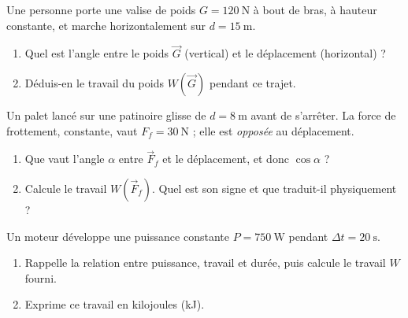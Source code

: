 \documentclass[11pt,a4paper]{article}
\newcommand{\vv}[1]{\vec{#1}}\newcommand{\ds}{\displaystyle}
\begin{document}
\begin{exo}
Une personne porte une valise de poids $G=\qty{120}{\newton}$ à bout de bras, à hauteur constante,
et marche horizontalement sur $d=\qty{15}{\metre}$.
\begin{enumerate}[label=\alph*)]
  \item Quel est l'angle entre le poids $\vv G$ (vertical) et le déplacement (horizontal) ?
  \item Déduis-en le travail du poids $W(\vv G)$ pendant ce trajet.
\end{enumerate}
\end{exo}

\begin{exo}
Un palet lancé sur une patinoire glisse de $d=\qty{8}{\metre}$ avant de s'arrêter. La force de
frottement, constante, vaut $F_f=\qty{30}{\newton}$ ; elle est \emph{opposée} au déplacement.
\begin{center}
\end{center}
\begin{enumerate}[label=\alph*)]
  \item Que vaut l'angle $\alpha$ entre $\vv F_f$ et le déplacement, et donc $\cos\alpha$ ?
  \item Calcule le travail $W(\vv F_f)$. Quel est son signe et que traduit-il physiquement ?
\end{enumerate}
\end{exo}

\begin{exo}
Un moteur développe une puissance constante $P=\qty{750}{\watt}$ pendant $\Delta t=\qty{20}{\second}$.
\begin{enumerate}[label=\alph*)]
  \item Rappelle la relation entre puissance, travail et durée, puis calcule le travail $W$ fourni.
  \item Exprime ce travail en kilojoules (\si{\kilo\joule}).
\end{enumerate}
\end{exo}
\end{document}

